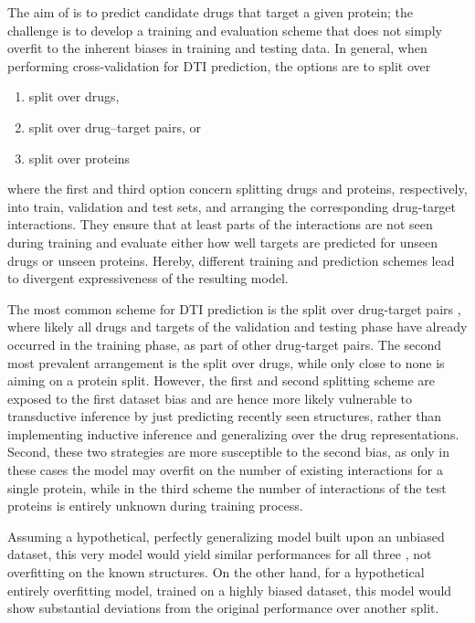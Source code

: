 \documentclass{bioinfo}
\begin{document}

The aim of \name is to predict candidate drugs that target a given
protein; the challenge is to develop a training and evaluation scheme
that does not simply overfit to the inherent biases in training and
testing data.
In general, when performing cross-validation for DTI prediction, the
options are to split over 
\begin{enumerate}
	\item split over drugs,
	\item split over drug--target pairs, or
	\item split over proteins
\end{enumerate}
where the first and third option concern splitting drugs and proteins,
respectively, into train, validation and test sets, and arranging the
corresponding drug-target interactions. They ensure that at least
parts of the interactions are not seen during training and evaluate
either how well targets are predicted for unseen drugs or unseen
proteins. Hereby, different training and prediction schemes lead to
divergent expressiveness of the resulting model.

 The most common scheme for DTI
prediction is the split over drug-target pairs \citep{Survey2018},
where likely all drugs and targets of the validation and testing phase
have already occurred in the training phase, as part of other
drug-target pairs. The second most prevalent arrangement is the split
over drugs, while only close to none is aiming on a protein split.
However, the first and second splitting scheme are exposed to the
first dataset bias and are hence more likely vulnerable to
transductive inference by just predicting recently seen structures,
rather than implementing inductive inference and generalizing over the
drug representations. Second, these two strategies are more
susceptible to the second bias, as only in these cases the model may
overfit on the number of existing interactions for a single protein,
while in the third scheme the number of interactions of the test
proteins is entirely unknown during training process.

Assuming a hypothetical, perfectly generalizing model built upon an
unbiased dataset, this very model would yield similar performances for
all three , not overfitting on the known
structures. On the other hand, for a hypothetical entirely overfitting
model, trained on a highly biased dataset, this model would show
substantial deviations from the original performance over another
split.
\end{document}
